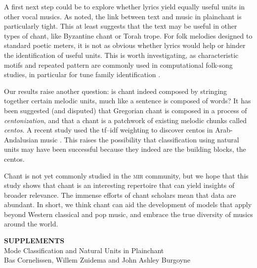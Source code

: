 \documentclass{article}
\begin{document}
A first next step could be to explore whether lyrics yield equally useful units in other vocal musics.
As noted, the link between text and music in plainchant is particularly tight.
This at least suggests that the text may be useful in other types of chant, like Byzantine chant or Torah trope.
For folk melodies designed to standard poetic meters, it is not as obvious whether lyrics would help or hinder the identification of useful units.
This is worth investigating, as characteristic motifs and repeated pattern are commonly used in computational folk-song studies, in particular for tune family identification \cite{Volk2012,Janssen2017a}.


Our results raise another question: is chant indeed composed by stringing together certain melodic units, much like a sentence is composed of words?
It has been suggested (and disputed) that Gregorian chant is composed in a process of \emph{centonization}, and that a chant is a patchwork of existing melodic chunks called \emph{centos}.
A recent study used the tf--idf weighting to discover centos in  Arab-Andalusian music \cite{Nuttall2019}.
This raises the possibility that classification using natural units may have been successful because they indeed are the building blocks, the centos.


Chant is not yet commonly studied in the \textsc{mir} community, but we hope that this study shows that chant is an interesting repertoire that can yield insights of broader relevance. 
The immense efforts of chant scholars mean that data are abundant.
In short, we think chant can aid the development of models that apply beyond Western classical and pop music, and embrace the true diversity of musics around the world.














\clearpage
\onecolumn
\setcounter{figure}{0}
\renewcommand{\thefigure}{S\arabic{figure}}%

\begin{center} 
    {\Large \bf \uppercase{Supplements} \\[.5em]}
    {\Large Mode Classification and Natural Units in Plainchant}
    \\[.5em]
    {\large Bas Cornelissen, Willem Zuidema and John Ashley Burgoyne}
\end{center}
\end{document}
